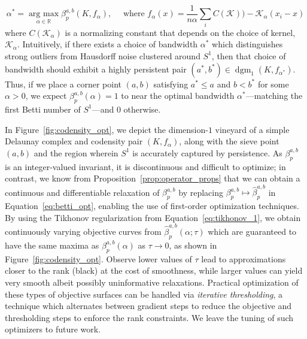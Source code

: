 \documentclass[pdflatex,sn-mathphys-num]{sn-jnl}
\begin{document}
\[\label{eq:betti_opt}
\alpha^{\ast} = \operatorname{arg\ max}\limits_{\alpha \in \mathbb{R}}\beta_{p}^{a,b}\left( K,f_{\alpha} \right),\quad\text{ where }f_{\alpha}(x) = \frac{1}{n\alpha}\sum_{i}C\left( \mathcal{K} \right)) - \mathcal{K}_{\alpha}\left. \left( x_{i} - x \right) \right.
\]
where \(C\left( \mathcal{K}_{\alpha} \right)\) is a normalizing constant that depends on the choice of kernel, \(\mathcal{K}_{\alpha}\). Intuitively, if there exists a choice of bandwidth \(\alpha^{\ast}\) which distinguishes strong outliers from Hausdorff noise clustered around \(S^{1}\), then that choice of bandwidth should exhibit a highly persistent pair \(\left. \left( a^{\ast},b^{\ast} \right) \right. \in \operatorname{dgm}_{1}\left. \left( K,f_{\alpha^{\ast}} \right) \right.\). Thus, if we place a corner point \((a,b)\) satisfying \(a^{\ast} \leq a\) and \(b < b^{\ast}\) for some \(\alpha > 0\), we expect \(\beta_{p}^{a,b}(\alpha) = 1\) to near the optimal bandwidth \(\alpha^{\ast}\)---matching the first Betti number of \(S^{1}\)---and \(0\) otherwise.

In Figure~\ref{fig:codensity_opt}, we depict the dimension-\(1\) vineyard of a simple Delaunay complex and codensity pair \(\left( K,f_{\alpha} \right)\), along with the sieve point \((a,b)\) and the region wherein \(S^{1}\) is accurately captured by persistence. As \(\beta_{p}^{a,b}\) is an integer-valued invariant, it is discontinuous and difficult to optimize; in contrast, we know from Proposition~\ref{prop:operator_props} that we can obtain a continuous and differentiable relaxation of \(\beta_{p}^{a,b}\) by replacing \(\beta_{p}^{a,b} \mapsto {\hat{\beta}}_{p}^{a,b}\) in Equation~\ref{eq:betti_opt}, enabling the use of first-order optimization techniques. By using the Tikhonov regularization from Equation~\ref{eq:tikhonov_1}, we obtain continuously varying objective curves from \({\hat{\beta}}_{p}^{a,b}(\alpha;\tau)\) which are guaranteed to have the same maxima as \(\beta_{p}^{a,b}(\alpha)\) as \(\tau \rightarrow 0\), as shown in Figure~\ref{fig:codensity_opt}. Observe lower values of \(\tau\) lead to approximations closer to the rank (black) at the cost of smoothness, while larger values can yield very smooth albeit possibly uninformative relaxations. Practical optimization of these types of objective surfaces can be handled via \emph{iterative thresholding}, a technique which alternates between gradient steps to reduce the objective and thresholding steps to enforce the rank constraints. We leave the tuning of such optimizers to future work.
\end{document}
